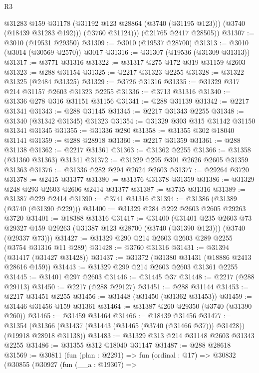 \begin{lexlean}{R3}
\begin{coremodule}
            @31283
            @159
            @31178
            (@31192 @123 @28864 (@3740 (@31195 @123)))
            (@3740 (@18439 @31283 @192)))
          (@3760 @31124)))
      (@21765 @2417 @28505))
@31307 := @3010 (@19531 @29350)
@31309 := @3010 (@19537 @28700)
@31313 := @3010 (@3014 (@30569 @2570)) @3017
@31316 := @31307 (@19536 (@31309 @31313))
@31317 := @3771 @31316
@31322 := @31317 @275 @172 @319 @31159 @2603
@31323 := @288 @31154
@31325 := @2217 @31323 @2255
@31328 := @31322 @31325 (@2484 @31325)
@31329 := @3726 @31316
@31335 := @31329 @317 @214 @31157 @2603 @31323 @2255
@31336 := @3713 @31316
@31340 := @31336 @278 @316 @31151 @31156
@31341 := @288 @31139
@31342 := @2217 @31341
@31343 := @288 @31145
@31345 := @2217 @31343 @2255
@31348 := @31340 (@31342 @31345) @31323
@31354 := @31329 @303 @315 @31142 @31150 @31341 @31345
@31355 := @31336 @280
@31358 := @31355 @302 @18040 @31141
@31359 := @288 @28918
@31360 := @2217 @31359
@31361 := @288 @31138
@31362 := @2217 @31361
@31363 := @31362 @2255
@31366 := @31358 (@31360 @31363) @31341
@31372 := @31329 @295 @301 @2626 @2605 @31359 @31363
@31376 := @31336 @282 @294 @2624 @2603
@31377 := @29264 @3720
@31378 := @2415 @31377
@31380 := @31376 @31378 @31359
@31386 := @31329 @248 @293 @2603 @2606 @2414 @31377
@31387 := @3735 @31316
@31389 := @31387 @229 @2414
@31390 := @3741 @31316
@31394 := @31386 (@31389 (@3740 (@31390 @229)))
@31400 := @31329 @284 @292 @2603 @2605 @29263 @3720
@31401 := @18388 @31316
@31417 := @31400
    (@31401
      @235
      @2603
      @73
      @29327
      @159
      @29263
      (@31387 @123 @28700 (@3740 (@31390 @123)))
      (@3740 (@29337 @73)))
@31427 := @31329 @290 @214 @2603 @2603 @289 @2255 (@3754 @31316 @11 @289)
@31428 := @3760 @31316
@31431 := @31394 (@31417 (@31427 @31428))
@31437 := @31372 (@31380 @31431 (@18886 @2413 @28616 @159))
@31443 := @31329 @299 @214 @2603 @2603 @31361 @2255
@31445 := @31401 @297 @2603
@31446 := @31445 @37
@31448 := @2217 (@288 @29113)
@31450 := @2217 (@288 @29127)
@31451 := @288 @31144
@31453 := @2217 @31451 @2255
@31456 := @31448 (@31450 (@31362 @31453))
@31459 := @31446 @31456 @159 @31361
@31464 := @31387 @260 @29350 (@3740 (@31390 @260))
@31465 := @31459 @31464
@31466 := @18439 @31456
@31477 := @31354
    (@31366 (@31437 (@31443 (@31465 (@3740 (@31466 @37))) @31428)) (@19918 @28918 @31138))
@31483 := @31329 @313 @214 @31148 @2603 @31343 @2255
@31486 := @31355 @312 @18040 @31147
@31487 := @288 @28618
@31569 := @30811
    (fun (plan : @2291) =>
    fun (ordinal : @17) =>
    @30832
      (@30855
        (@30927
          (fun (__a : @19307) =>

\end{coremodule}
\end{lexlean}
